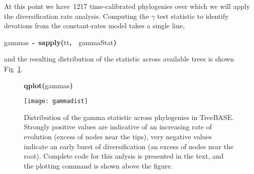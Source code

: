 \documentclass[authoryear, preprint]{elsarticle}
\makeatletter
\newcommand{\hlfunctioncall}[1]{\textcolor[rgb]{.5,0,.33}{\textbf{#1}}}%
\newcommand{\hlkeyword}[1]{\textbf{#1}}%
\newcommand{\hlassignement}[1]{\textbf{#1}}%
\newcommand{\hlsymbol}[1]{#1}%
\newenvironment{kframe}{%
 \def\FrameCommand##1{\hskip\@totalleftmargin \hskip-\fboxsep
 \colorbox{shadecolor}{##1}\hskip-\fboxsep
     \hskip-\linewidth \hskip-\@totalleftmargin \hskip\columnwidth}%
 \MakeFramed {\advance\hsize-\width
   \@totalleftmargin\z@ \linewidth\hsize
   \@setminipage}}%
 {\par\unskip\endMakeFramed}
\newenvironment{knitrout}{}{} %
\makeatother
\begin{document}
At this point we have~1217 time-calibrated phylogenies over which we will apply the diversification rate analysis. 
Computing the $\gamma$ test statistic to identify devations from the constant-rates model takes a single line,

\begin{knitrout}
\color{fgcolor}\begin{kframe}
\begin{flushleft}
\ttfamily\noindent
\hlsymbol{gammas}{\ }\hlassignement{\usebox{\hlnormalsizeboxlessthan}-}{\ }\hlfunctioncall{sapply}\hlkeyword{(}\hlsymbol{tt}\hlkeyword{,}{\ }{\ }\hlsymbol{gammaStat}\hlkeyword{)}\mbox{}
\normalfont
\end{flushleft}
\end{kframe}
\end{knitrout}

and the resulting distribution of the statistic across available trees is shown Fig~\ref{gammas}.

\begin{figure}
  \begin{center}
\begin{knitrout}
\color{fgcolor}\begin{kframe}
\begin{flushleft}
\ttfamily\noindent
\hlfunctioncall{qplot}\hlkeyword{(}\hlsymbol{gammas}\hlkeyword{)}\mbox{}
\normalfont
\end{flushleft}
\texttt{[image: gammadist]} \end{kframe}
\end{knitrout}

  \caption{ Distribution of the gamma statistic across phylogenies in TreeBASE. Strongly positive values are indicative of an increasing
  rate of evolution (excess of nodes near the tips), very negative values indicate an early burst of diversification (an excess of nodes
  near the root).   Complete code for this anlysis is presented in the text, and the plotting command is shown above the figure.}\label{gammas}
  \end{center}
\end{figure}
\end{document}
